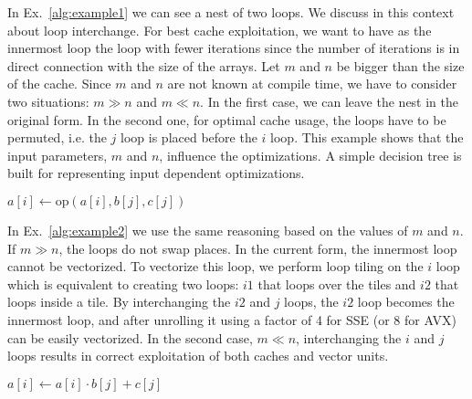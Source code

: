 In Ex.~\ref{alg:example1} we can see a nest of two loops. We discuss in this
context about loop interchange. For best cache exploitation, we want to have as
the innermost loop the loop with fewer iterations since the number of iterations
is in direct connection with the size of the arrays. Let $m$ and $n$ be bigger
than the size of the cache. Since $m$ and $n$ are not known at compile time, we
have to consider two situations: $m \gg n$ and $m \ll n$. In the first case, we
can leave the nest in the original form. In the second one, for optimal cache
usage, the loops have to be permuted, i.e. the $j$ loop is placed before the $i$
loop. This example shows that the input parameters, $m$ and $n$, influence the
optimizations. A simple decision tree is built for representing input dependent
optimizations.

\begin{algorithm}[h]
\small{
	\caption{}
	\label{alg:example1}                       
 	\begin{algorithmic}[0]
				\State $a[i] \leftarrow \text{op}(a[i], b[j], c[j])$
			\EndFor
    	\EndFor
 	\end{algorithmic}
}
\end{algorithm}

In Ex.~\ref{alg:example2} we use the same reasoning based on the values of $m$
and $n$. If $m \gg n$, the loops do not swap places. In the current form, the
innermost loop cannot be vectorized. To vectorize this loop, we perform loop
tiling on the $i$ loop which is equivalent to creating two loops: $\textit{i1}$
that loops over the tiles and $\textit{i2}$ that loops inside a tile. By
interchanging the $\textit{i2}$ and $j$ loops, the $\textit{i2}$ loop becomes
the innermost loop, and after unrolling it using a factor of 4 for SSE (or 8 for
AVX) can be easily vectorized. In the second case,  $m \ll n$, interchanging the
$i$ and $j$ loops results in correct exploitation of both caches and vector
units.

\begin{algorithm}[h]
\small{
	\caption{}
 	\label{alg:example2}                       
 	\begin{algorithmic}[0]
				\State $a[i] \leftarrow a[i] \cdot b[j] + c[j]$
			\EndFor
    	\EndFor
 	\end{algorithmic}
}
\end{algorithm}

